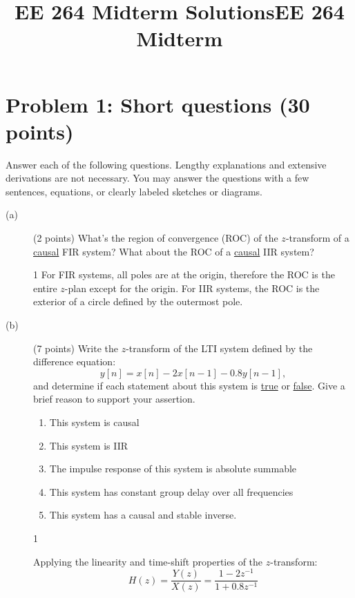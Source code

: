 \documentclass[10pt]{article}
\title{EE 264 Midterm Solutions}
\title{EE 264 Midterm}
\def\SOLUTIONS{0} %
\def\SolutionsColor{red2}
\begin{document}

\pagebreak

\section*{Problem 1: Short questions (30 points)}

Answer each of the following questions. Lengthy explanations and extensive derivations are not necessary. You may answer the questions with a few sentences, equations, or clearly labeled sketches or diagrams.

\begin{description}
\item[(a)] (2 points) What's the region of convergence (ROC) of the $z$-transform of a \underline{causal} FIR system? What about the ROC of a \underline{causal} IIR system? 

\if\SOLUTIONS1
{\color{\SolutionsColor} For FIR systems, all poles are at the origin, therefore the ROC is the entire $z$-plan except for the origin. For IIR systems, the ROC is the exterior of a circle defined by the outermost pole.
}
\else\vspace{3cm}
\fi

%
\item[(b)] (7 points) Write the $z$-transform of the LTI system defined by the difference equation:
\begin{equation}
y[n] = x[n] - 2x[n-1] - 0.8y[n-1],
\end{equation}
and determine if each statement about this system is \underline{true} or \underline{false}. Give a brief reason to support your assertion.

\begin{enumerate}\setlength\itemsep{2em}
  \item This system is causal
  \item This system is IIR
  \item The impulse response of this system is absolute summable
  \item This system has constant group delay over all frequencies
  \item This system has a causal and stable inverse.
\end{enumerate}

\if\SOLUTIONS1
{\color{\SolutionsColor} Applying the linearity and time-shift properties of the $z$-transform:
\begin{equation*}
H(z) = \frac{Y(z)}{X(z)} = \frac{1 - 2z^{-1}}{1 + 0.8z^{-1}}
\end{equation*}

}
\end{description}
\end{document}
